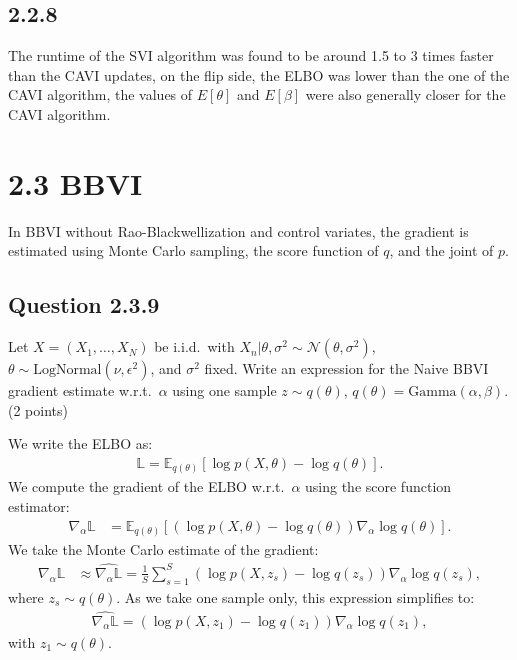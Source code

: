 \documentclass{article}
\begin{document}
\begin{multicols}{2}
    \subsection*{2.2.8}

    The runtime of the SVI algorithm was found to be around 1.5 to 3 times faster than the CAVI updates, on the flip side, the ELBO was lower
    than the one of the CAVI algorithm, the values of $E[\theta]$ and $E[\beta]$ were also generally closer for the CAVI algorithm.    


\section*{2.3 BBVI}
In BBVI without Rao-Blackwellization and control variates, the gradient is estimated using Monte Carlo sampling, the score function of \(q\), and the joint of \(p\).

\subsection*{Question 2.3.9}
Let \(X = (X_1, \dots, X_N)\) be i.i.d.\ with \(X_n | \theta, \sigma^2 \sim \mathcal{N}(\theta, \sigma^2)\), \(\theta \sim \text{LogNormal}(\nu, \epsilon^2)\), and \(\sigma^2\) fixed. Write an expression for the Naive BBVI gradient estimate w.r.t.\ \(\alpha\) using one sample \(z \sim q(\theta)\), \(q(\theta) = \text{Gamma}(\alpha, \beta)\). (2 points)\bigskip 

We write the ELBO as:
\begin{align*}
    \mathbb{L} = \mathbb{E}_{q(\theta)}\left[\log p(X, \theta) - \log q(\theta)\right].
\end{align*}
We compute the gradient of the ELBO w.r.t.\ \(\alpha\) using the score function estimator:
\begin{align*}
    \nabla_\alpha \mathbb{L} &= \mathbb{E}_{q(\theta)}\left[(\log p(X, \theta) - \log q(\theta)) \nabla_\alpha \log q(\theta) \right].
\end{align*}
We take the Monte Carlo estimate of the gradient:
\begin{align*}
    \nabla_\alpha \mathbb{L} &\approx \widehat{\nabla_\alpha \mathbb{L}} = \frac{1}{S}\sum_{s=1}^{S}(\log p(X, z_s) - \log q(z_s)) \nabla_\alpha \log q(z_s),
\end{align*}
where \(z_s \sim q(\theta)\). As we take one sample only, this expression simplifies to:
\begin{align*}
    \widehat{\nabla_\alpha \mathbb{L}} = (\log p(X, z_1) - \log q(z_1)) \nabla_\alpha \log q(z_1),
\end{align*}
with \(z_1 \sim q(\theta)\).


\end{multicols}
\end{document}
